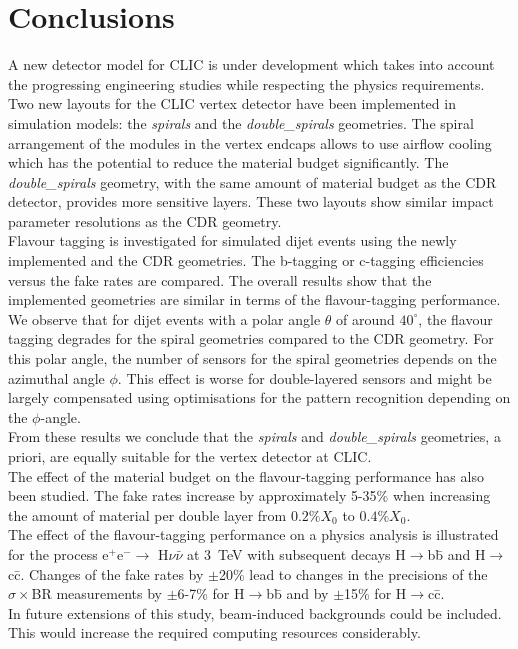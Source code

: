 \section{Conclusions}\label{sec:Conclusions}
A new detector model for CLIC is under development which takes into account the progressing engineering studies while respecting the physics requirements. \\
Two new layouts for the CLIC vertex detector have been implemented in simulation models: the \textit{spirals} and the \textit{double\_spirals} geometries. The spiral arrangement of the modules in the vertex endcaps allows to use airflow cooling which has the potential to reduce the material budget significantly. The \textit{double\_spirals} geometry, with the same amount of material budget as the CDR detector, provides more sensitive layers. These two layouts show similar impact parameter resolutions as the CDR geometry.\\
Flavour tagging is investigated for simulated dijet events using the newly implemented and the CDR geometries. The b-tagging or c-tagging efficiencies versus the fake rates are compared. The overall results show that the implemented geometries are similar in terms of the flavour-tagging performance. We observe that for dijet events with a polar angle $\theta$ of around $40^\circ$, the flavour tagging degrades for the spiral geometries compared to the CDR geometry. For this polar angle, the number of sensors for the spiral geometries depends on the azimuthal angle $\phi$. This effect is worse for double-layered sensors and might be largely compensated using optimisations for the pattern recognition depending on the $\phi$-angle. \\
From these results we conclude that the \textit{spirals} and \textit{double\_spirals} geometries, a priori, are equally suitable for the vertex detector at CLIC. \\
The effect of the material budget on the flavour-tagging performance has also been studied. The fake rates increase by approximately 5-35\% when increasing the amount of material per double layer from $0.2\%X_{0}$ to $0.4\%X_{0}$. \\
The effect of the flavour-tagging performance on a physics analysis is illustrated for the process e$^+$e$^-\rightarrow$ H$\nu\bar{\nu}$ at 3~TeV with subsequent decays H$\rightarrow$b\={b} and H$\rightarrow$c\={c}. Changes of the fake rates by $\pm$20\% lead to changes in the precisions of the $\sigma \times$BR measurements by $\pm$6-7\% for H$\rightarrow$b\={b} and by $\pm$15\% for H$\rightarrow$c\={c}. \\
In future extensions of this study, beam-induced backgrounds could be included. This would increase the required computing resources considerably. 

